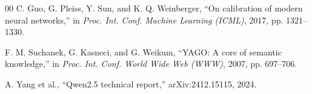 \documentclass[conference]{IEEEtran}
\begin{document}
\begin{thebibliography}{00}
 C. Guo, G. Pleiss, Y. Sun, and K. Q. Weinberger, ``On
calibration of modern neural networks,'' in \emph{Proc. Int. Conf. Machine
Learning (ICML)}, 2017, pp. 1321--1330.


 F. M. Suchanek, G. Kasneci, and G. Weikum, ``YAGO: A core
of semantic knowledge,'' in \emph{Proc. Int. Conf. World Wide Web (WWW)}, 2007,
pp. 697--706.

 A. Yang et al., ``Qwen2.5 technical report,'' arXiv:2412.15115,
2024.

\end{thebibliography}
\end{document}
